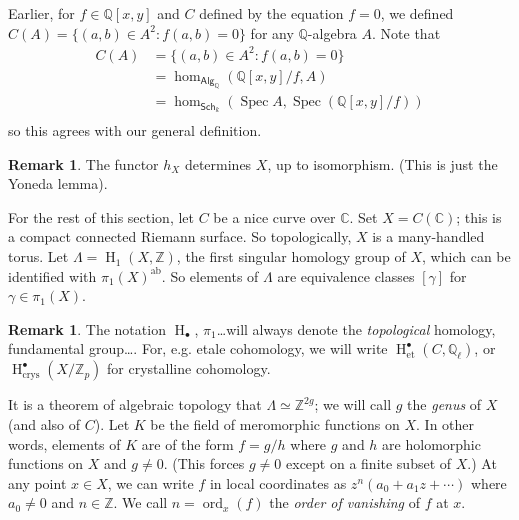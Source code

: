 \documentclass{article}
\DeclareMathOperator{\h}{H}
\DeclareMathOperator{\ord}{ord}
\DeclareMathOperator{\spec}{Spec}
\theoremstyle{definition}
\newtheorem{remark}[subsection]{Remark}
\begin{document}
Earlier, for $f\in \mathbb{Q}[x,y]$ and $C$ defined by the equation $f=0$, we 
defined $C(A)=\{(a,b)\in A^2:f(a,b)=0\}$ for any $\mathbb{Q}$-algebra $A$. 
Note that 
\begin{align*}
  C(A) &= \{(a,b)\in A^2:f(a,b) = 0\} \\
    &= \hom_{\mathsf{Alg}_\mathbb{Q}}(\mathbb{Q}[x,y]/f,A) \\
    &= \hom_{\mathsf{Sch}_k}\left(\spec A,\spec(\mathbb{Q}[x,y]/f)\right) \\
\end{align*}
so this agrees with our general definition. 

\begin{remark}
The functor $h_X$ determines $X$, up to isomorphism. (This is just the Yoneda 
lemma).
\end{remark}

For the rest of this section, let $C$ be a nice curve over $\mathbb{C}$. Set 
$X=C(\mathbb{C})$; this is a compact connected Riemann surface. So 
topologically, $X$ is a many-handled torus. Let $\Lambda=\h_1(X,\mathbb{Z})$, 
the first singular homology group of $X$, which can be identified with 
$\pi_1(X)^\text{ab}$. So elements of $\Lambda$ are equivalence classes 
$[\gamma]$ for $\gamma\in \pi_1(X)$. 

\begin{remark}
The notation $\h_\bullet$, $\pi_1$\ldots will always denote the 
\emph{topological} homology, fundamental group\ldots. For, e.g. 
etale cohomology, we will write $\h_\text{et}^\bullet(C,\mathbb{Q}_\ell)$, or 
$\h_\text{crys}^\bullet(X/\mathbb{Z}_p)$ for crystalline cohomology.
\end{remark}

It is a theorem of algebraic topology that $\Lambda\simeq\mathbb{Z}^{2 g}$; we 
will call $g$ the \emph{genus} of $X$ (and also of $C$). Let $K$ be the field 
of meromorphic functions on $X$. In other words, elements of $K$ are of the 
form $f=g/h$ where $g$ and $h$ are holomorphic functions on $X$ and $g\ne 0$. 
(This forces $g\ne 0$ except on a finite subset of $X$.) At any point 
$x\in X$, we can write $f$ in local coordinates as $z^n(a_0+a_1 z+\cdots)$ 
where $a_0\ne 0$ and $n\in\mathbb{Z}$. We call $n=\ord_x(f)$ the \emph{order 
of vanishing} of $f$ at $x$. 
 
\end{document}
